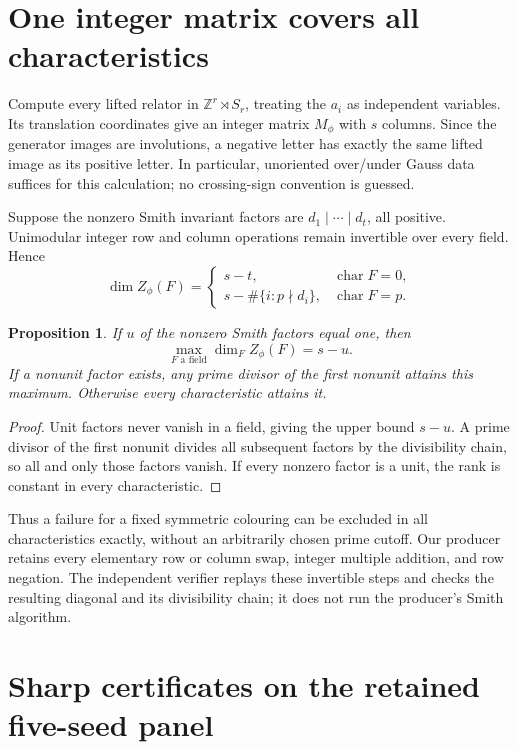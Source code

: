 \documentclass[11pt]{article}
\newtheorem{proposition}[theorem]{Proposition}
\begin{document}
\section{One integer matrix covers all characteristics}

Compute every lifted relator in $\mathbb Z^r\rtimes S_r$, treating the
$a_i$ as independent variables. Its translation coordinates give an
integer matrix $M_\phi$ with $s$ columns. Since the generator images
are involutions, a negative letter has exactly the same lifted image
as its positive letter. In particular, unoriented over/under Gauss data
suffices for this calculation; no crossing-sign convention is guessed.

Suppose the nonzero Smith invariant factors are
$d_1\mid\cdots\mid d_t$, all positive. Unimodular integer row and column
operations remain invertible over every field. Hence
\[
 \dim Z_\phi(F)=
 \begin{cases}
 s-t,&\operatorname{char}F=0,\\
 s-\#\{i:p\nmid d_i\},&\operatorname{char}F=p.
 \end{cases}
\]

\begin{proposition}\label{prop:max}
If $u$ of the nonzero Smith factors equal one, then
\[
       \max_{F\text{ a field}}\dim_F Z_\phi(F)=s-u.
\]
If a nonunit factor exists, any prime divisor of the first nonunit
attains this maximum. Otherwise every characteristic attains it.
\end{proposition}
\begin{proof}
Unit factors never vanish in a field, giving the upper bound $s-u$.
A prime divisor of the first nonunit divides all subsequent factors by
the divisibility chain, so all and only those factors vanish. If every
nonzero factor is a unit, the rank is constant in every characteristic.
\end{proof}

Thus a failure for a fixed symmetric colouring can be excluded in all
characteristics exactly, without an arbitrarily chosen prime cutoff.
Our producer retains every elementary row or column swap, integer
multiple addition, and row negation. The independent verifier replays
these invertible steps and checks the resulting diagonal and its
divisibility chain; it does not run the producer's Smith algorithm.

\section{Sharp certificates on the retained five-seed panel}
\end{document}
